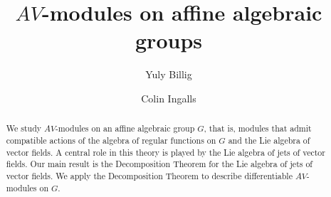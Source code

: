 \documentclass[12pt]{amsart}
\begin{document}

\newtheorem{theorem}{Theorem}
\newtheorem{proposition}[theorem]{Proposition}
\newtheorem{corollary}[theorem]{Corollary}
\newtheorem{lemma}[theorem]{Lemma}
\newtheorem{definition}[theorem]{Definition}
\newtheorem{remark}[theorem]{Remark}
\newtheorem{conjecture}[theorem]{Conjecture}
\newtheorem{example}[theorem]{Example}

\newcommand\Z{{\mathbb Z}}
\newcommand\K{{\mathbb K}}
\newcommand\R{{\mathbb R}}
\newcommand\A{{\mathcal A}}
\newcommand\D{{\mathcal D}}
\newcommand\C{{\mathcal C}}
\newcommand\AV{{\mathcal {AV}}}
\newcommand\F{{\mathcal F}}
\newcommand\V{{\mathcal V}}
\newcommand\LL{{\mathcal L}}
\newcommand\hL{\widehat{\mathcal L}}
\newcommand\dd[1]{\frac{\partial}{\partial #1}}
\newcommand\Der{\textup{Der\,}}
\newcommand\Hom{\textup{Hom}}
\newcommand\Span{\textup{Span}}
\newcommand\End{\textup{End}}
\newcommand\ad{\textup{ad}}
\newcommand\tr{\textup{tr}}
\newcommand\id{\textup{id}}
\newcommand\gl{\mathfrak{gl}}
\newcommand\g{\mathfrak{g}}
\newcommand\m{\mathfrak{m}}
\newcommand\sll{\mathfrak{sl}}
\newcommand\NN{{\mathcal N}}

\title
[$AV$-modules on affine algebraic groups]
{$AV$-modules on affine algebraic groups}
\author{Yuly Billig}
\address{School of Mathematics and Statistics, Carleton University, Ottawa, Canada}
\author{Colin Ingalls}
\let\thefootnote\relax{}

\maketitle

\begin{abstract}
We study $AV$-modules on an affine algebraic group $G$, that is, modules that admit compatible actions of the algebra of regular functions on $G$ and the Lie algebra of vector fields. A central role in this theory is played by the Lie algebra of jets of vector fields. Our main result is the Decomposition Theorem for the Lie algebra of jets of vector fields. We apply the Decomposition Theorem to describe differentiable $AV$-modules on $G$.
\end{abstract}
\end{document}

